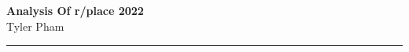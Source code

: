 \documentclass[a4paper,12pt]{article}
\begin{document}
\pagestyle{fancy}
\thispagestyle{empty}
\renewcommand*{\thefootnote}{\fnsymbol{footnote}}
\begin{center}
\Large{\textbf{Analysis Of r/place 2022}}
\vspace{0.1cm}
\normalsize
\\ Tyler Pham \\
\vspace{0.1cm}
\medskip
\normalsize
\end{center}
{\color{gray}\hrule}
\vspace{0.1cm}



\end{document}

